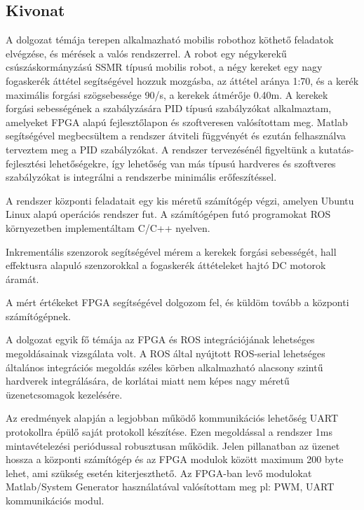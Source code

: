 \begin{titlepage}

\section*{Kivonat}

A dolgozat témája terepen alkalmazható mobilis robothoz köthető feladatok elvégzése, és mérések a valós rendszerrel. A robot egy négykerekű csúszáskormányzású SSMR típusú mobilis robot, a négy kereket egy nagy fogaskerék áttétel segítségével hozzuk mozgásba, az áttétel aránya 1:70, és a kerék maximális forgási szögsebessége 90\degree/s, a kerekek átmérője 0.40m.
A kerekek forgási sebességének a szabályzására PID típusú szabályzókat alkalmaztam, amelyeket FPGA alapú fejlesztőlapon és szoftveresen valósítottam meg.
Matlab segítségével megbecsültem a rendszer átviteli függvényét és ezután felhasználva terveztem meg a PID szabályzókat. A rendszer tervezésénél figyeltünk a kutatás-fejlesztési lehetőségekre, így lehetőség van más típusú hardveres és szoftveres szabályzókat is integrálni a rendszerbe minimális erőfeszítéssel.

A rendszer központi feladatait egy kis méretű számítógép végzi, amelyen Ubuntu Linux alapú operációs rendszer fut. A számítógépen futó programokat ROS környezetben implementáltam C/C++ nyelven.

Inkrementális szenzorok segítségével mérem a kerekek forgási sebességét, hall effektusra alapuló szenzorokkal a fogaskerék áttételeket hajtó DC motorok áramát.

A mért értékeket FPGA segítségével dolgozom fel, és küldöm tovább a központi számítógépnek.

A dolgozat egyik fő témája az FPGA és ROS integrációjának lehetséges megoldásainak vizsgálata volt.
A ROS által nyújtott ROS-serial lehetséges általános integrációs megoldás széles körben alkalmazható alacsony szintű hardverek integrálására, de korlátai miatt nem képes nagy méretű üzenetcsomagok kezelésére.

Az eredmények alapján a legjobban működő kommunikációs lehetőség UART protokollra épülő saját protokoll készítése. Ezen megoldással a rendszer 1ms mintavételezési periódussal robusztusan működik. Jelen pillanatban az üzenet hossza a központi számítógép és az FPGA modulok között maximum 200 byte lehet, ami szükség esetén kiterjeszthető.
Az FPGA-ban levő modulokat Matlab/System Generator használatával valósítottam meg pl: PWM, UART kommunikációs modul.


\end{titlepage}
